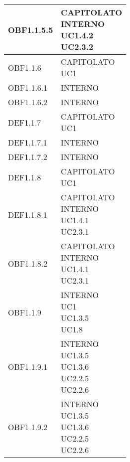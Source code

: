 \documentclass{scalatekids-article}
\begin{document}
\begin{longtable}[H]{|p{5.5cm}|p{5.5cm}|}
\hline
OBF1.1.5.5 & \multiLineCell[t]{CAPITOLATO\\INTERNO\\UC1.4.2\\UC2.3.2\\}\\
\hline
OBF1.1.6 & \multiLineCell[t]{CAPITOLATO\\UC1\\}\\
\hline
OBF1.1.6.1 & \multiLineCell[t]{INTERNO\\}\\
\hline
OBF1.1.6.2 & \multiLineCell[t]{INTERNO\\}\\
\hline
DEF1.1.7 & \multiLineCell[t]{CAPITOLATO\\UC1\\}\\
\hline
DEF1.1.7.1 & \multiLineCell[t]{INTERNO\\}\\
\hline
DEF1.1.7.2 & \multiLineCell[t]{INTERNO\\}\\
\hline
DEF1.1.8 & \multiLineCell[t]{CAPITOLATO\\UC1\\}\\
\hline
DEF1.1.8.1 & \multiLineCell[t]{CAPITOLATO\\INTERNO\\UC1.4.1\\UC2.3.1\\}\\
\hline
OBF1.1.8.2 & \multiLineCell[t]{CAPITOLATO\\INTERNO\\UC1.4.1\\UC2.3.1\\}\\
\hline
OBF1.1.9 & \multiLineCell[t]{INTERNO\\UC1\\UC1.3.5\\UC1.8\\}\\
\hline
OBF1.1.9.1 & \multiLineCell[t]{INTERNO\\UC1.3.5\\UC1.3.6\\UC2.2.5\\UC2.2.6\\}\\
\hline
OBF1.1.9.2 & \multiLineCell[t]{INTERNO\\UC1.3.5\\UC1.3.6\\UC2.2.5\\UC2.2.6\\}\\

\end{longtable}
\end{document}
